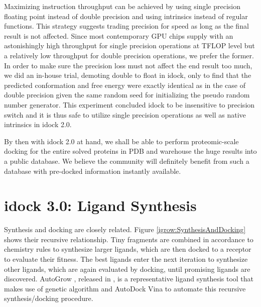 Maximizing instruction throughput can be achieved by using single precision floating point instead of double precision and using intrinsics instead of regular functions. This strategy suggests trading precision for speed as long as the final result is not affected. Since most contemporary GPU chips supply with an astonishingly high throughput for single precision operations at TFLOP level but a relatively low throughput for double precision operations, we prefer the former. In order to make sure the precision loss must not affect the end result too much, we did an in-house trial, demoting double to float in idock, only to find that the predicted conformation and free energy were exactly identical as in the case of double precision given the same random seed for initializing the pseudo random number generator. This experiment concluded idock to be insensitive to precision switch and it is thus safe to utilize single precision operations as well as native intrinsics in idock 2.0.

By then with idock 2.0 at hand, we shall be able to perform proteomic-scale docking for the entire solved proteins in PDB \citep{540,537} and warehouse the huge results into a public database. We believe the community will definitely benefit from such a database with pre-docked information instantly available.

\section{idock 3.0: Ligand Synthesis}

Synthesis and docking are closely related. Figure \ref{igrow:SynthesisAndDocking} shows their recursive relationship. Tiny fragments are combined in accordance to chemistry rules to synthesize larger ligands, which are then docked to a receptor to evaluate their fitness. The best ligands enter the next iteration to synthesize other ligands, which are again evaluated by docking, until promising ligands are discovered. AutoGrow \citep{466}, released in \citeyear{466}, is a representative ligand synthesis tool that makes use of genetic algorithm and AutoDock Vina \citep{595} to automate this recursive synthesis/docking procedure.

